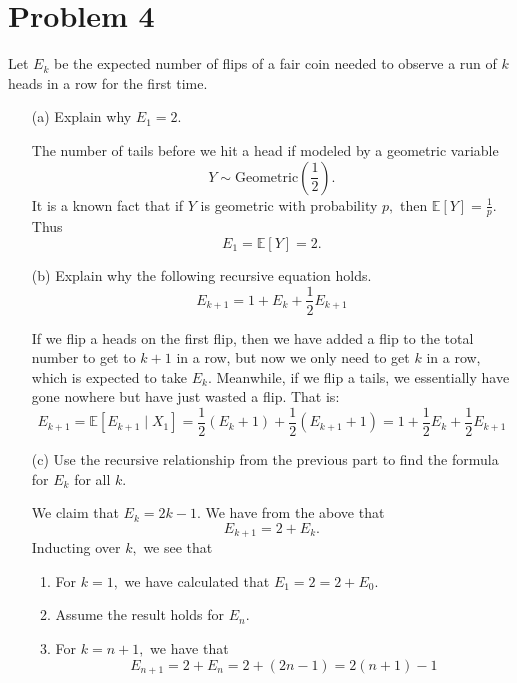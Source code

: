 \documentclass[11pt]{article}
\newcommand{\bbE}{\mathbb{E}}
\begin{document}
\newpage
\section*{Problem 4}

Let \( E_k \) be the expected number of flips of a fair coin needed to observe a run of \( k \) heads in a row for the first time.

\begin{enumerate}
    \item[(a)] Explain why \( E_1 = 2 \).
    \begin{solution}
The number of tails before we hit a head if modeled by a geometric variable 
\[Y \sim \text{Geometric}(\frac{1}{2}).\] It is a known fact that if $Y$ is geometric with probability $p,$ then $\bbE[Y] = \frac{1}{p}.$ Thus
        \[E_1 = \bbE[Y] = 2.\]
    \end{solution}
    \item[(b)] Explain why the following recursive equation holds.
    \[
    E_{k+1} = 1 + E_k + \frac{1}{2} E_{k+1}
    \]
\begin{solution}
If we flip a heads on the first flip, then we have added a flip to the total number to get to $k+1$ in a row, but now we only need to get $k$ in a row, which is expected to take $E_{k}.$ Meanwhile, if we flip a tails, we essentially have gone nowhere but have just wasted a flip. That is:
\[E_{k+1} = \bbE[E_{k+1} \mid X_1] = \frac{1}{2}(E_k + 1) + \frac{1}{2}(E_{k+1} + 1) = 1 + \frac{1}{2}E_k + \frac{1}{2}E_{k+1}\]
\end{solution}
    \item[(c)] Use the recursive relationship from the previous part to find the formula for \( E_k \) for all \( k \).
\begin{solution}
We claim that $E_{k} = 2k-1.$
    We have from the above that 
    \[E_{k+1} = 2 + E_k.\] Inducting over $k,$ we see that 
    \begin{enumerate}
        \item For $k = 1,$ we have calculated that $E_1 = 2 = 2 + E_0.$
        \item Assume the result holds for $E_n.$ 
        \item For $k = n+1,$ we have that 
        \[E_{n+1} = 2 + E_{n} = 2 + (2n -1) = 2(n+1) - 1\]
    \end{enumerate}
\end{solution}
\end{enumerate}
\end{document}
